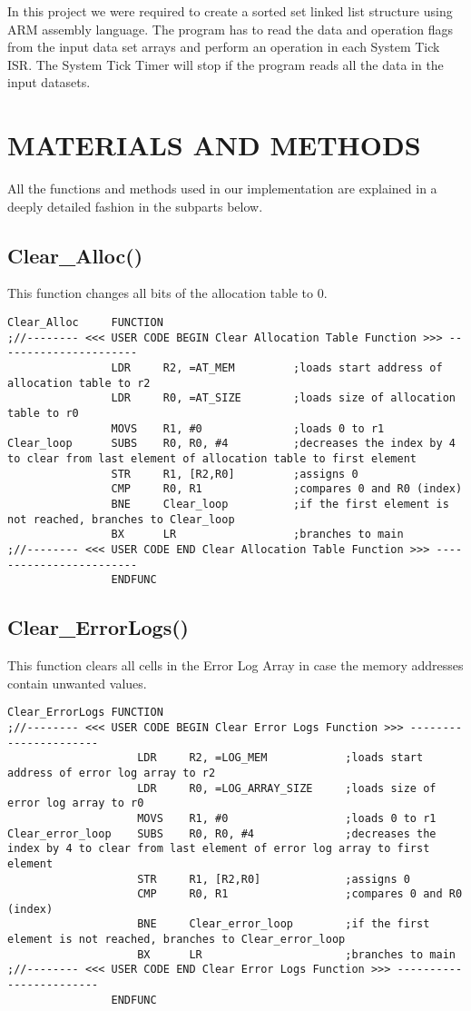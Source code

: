 \documentclass[pdftex,12pt,a4paper]{article}
\begin{document}
In this project we were required to create a sorted set linked list structure using ARM assembly language. The program has to
read the data and operation flags from the input data set arrays and perform an operation in each System Tick ISR. The System Tick Timer will stop if the program reads all the data in the input datasets.

\section{MATERIALS AND METHODS}
All the functions and methods used in our implementation are explained in a deeply detailed fashion in the subparts below.

\subsection{Clear\_Alloc()}
\par This function changes all bits of the allocation table to 0.
\begin{lstlisting}[caption=Clear\_Alloc, style=customasm]
Clear_Alloc		FUNCTION			
;//-------- <<< USER CODE BEGIN Clear Allocation Table Function >>> ----------------------																			
				LDR 	R2, =AT_MEM			;loads start address of allocation table to r2
				LDR 	R0, =AT_SIZE		;loads size of allocation table to r0
				MOVS	R1, #0				;loads 0 to r1
Clear_loop		SUBS	R0, R0, #4			;decreases the index by 4 to clear from last element of allocation table to first element
				STR		R1, [R2,R0]			;assigns 0
				CMP		R0, R1				;compares 0 and R0 (index)
				BNE		Clear_loop			;if the first element is not reached, branches to Clear_loop
				BX 		LR					;branches to main				
;//-------- <<< USER CODE END Clear Allocation Table Function >>> ------------------------				
				ENDFUNC
\end{lstlisting}

\subsection{Clear\_ErrorLogs()}
\par This function clears all cells in the Error Log Array in case the memory addresses contain unwanted values.
\begin{lstlisting}[caption=Clear\_ErrorLogs, style=customasm]
Clear_ErrorLogs	FUNCTION			
;//-------- <<< USER CODE BEGIN Clear Error Logs Function >>> ----------------------																		
					LDR 	R2, =LOG_MEM			;loads start address of error log array to r2
					LDR 	R0, =LOG_ARRAY_SIZE		;loads size of error log array to r0
					MOVS	R1, #0					;loads 0 to r1
Clear_error_loop	SUBS	R0, R0, #4				;decreases the index by 4 to clear from last element of error log array to first element
					STR		R1, [R2,R0]				;assigns 0
					CMP		R0, R1					;compares 0 and R0 (index)
					BNE		Clear_error_loop		;if the first element is not reached, branches to Clear_error_loop
					BX 		LR						;branches to main				
;//-------- <<< USER CODE END Clear Error Logs Function >>> ------------------------				
				ENDFUNC
\end{lstlisting}
\end{document}
